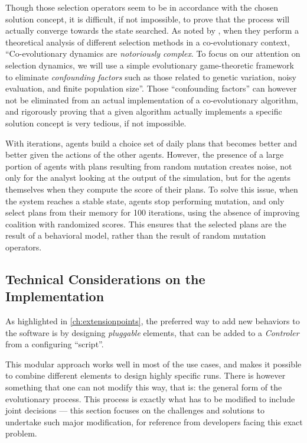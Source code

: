 {Though those selection operators seem to be in accordance with the
chosen solution concept, it is difficult, if not impossible, to prove
that the process will actually converge towards the state searched. As
noted by \cite{FiciciEtAl_ITEC_2005}, when they perform a theoretical
analysis of different selection methods in a co-evolutionary context,
``Co-evolutionary dynamics are \emph{notoriously complex}. To focus on
our attention on selection dynamics, we will use a simple evolutionary
game-theoretic framework to eliminate \emph{confounding factors} such as
those related to genetic variation, noisy evaluation, and finite
population size''. Those ``confounding factors'' can however not be
eliminated from an actual implementation of a co-evolutionary algorithm,
and rigorously proving that a given algorithm actually implements a
specific solution concept is very tedious, if not impossible.

With iterations, agents build a choice set of daily plans that becomes
better and better given the actions of the other agents. However, the
presence of a large portion of agents with plans resulting from random
mutation creates noise, not only for the analyst looking at the output
of the simulation, but for the agents themselves when they compute the
score of their plans. To solve this issue, when the system reaches a
stable state, agents stop performing mutation, and only select plans
from their memory for 100 iterations, using the absence of improving
coalition with randomized scores. This ensures that the selected plans
are the result of a behavioral model, rather than the result of random
mutation operators.

\subsection{Technical Considerations on the Implementation}
As highlighted in \cref{ch:extensionpoints},
the preferred way to add new behaviors to the \matsim software is
by designing \emph{pluggable} elements,
that can be added to a \emph{Controler} from a configuring ``script''.

This modular approach works well in most of the use cases,
and makes it possible to combine different elements to design highly
specific runs.
There is however something that one can not modify this way,
that is: the general form of the evolutionary process.
This process is exactly what has to be modified to include joint decisions
--- 
this section focuses on the challenges and solutions to undertake such major
modification, for reference from developers facing this exact problem.

}
